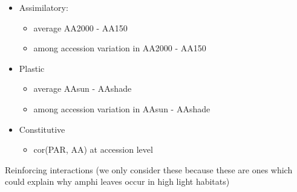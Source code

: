 \documentclass[
  letterpaper,
  DIV=11,
  numbers=noendperiod]{scrartcl}
\providecommand{\tightlist}{%
  \setlength{\itemsep}{0pt}\setlength{\parskip}{0pt}}\usepackage{longtable,booktabs,array}
\begin{document}
\begin{itemize}
\tightlist
\item
  Assimilatory:

  \begin{itemize}
  \tightlist
  \item
    average AA2000 - AA150
  \item
    among accession variation in AA2000 - AA150
  \end{itemize}
\item
  Plastic

  \begin{itemize}
  \tightlist
  \item
    average AAsun - AAshade
  \item
    among accession variation in AAsun - AAshade
  \end{itemize}
\item
  Constitutive

  \begin{itemize}
  \tightlist
  \item
    cor(PAR, AA) at accession level
  \end{itemize}
\end{itemize}

Reinforcing interactions (we only consider these because these are ones
which could explain why amphi leaves occur in high light habitats)
\end{document}
